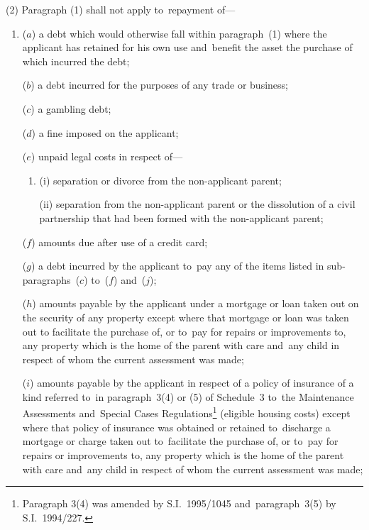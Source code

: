 \documentclass[12pt,a4paper]{article}
\begin{document}
(2) Paragraph (1) shall not apply to~repayment of—
\begin{enumerate}\item[]
($a$) a debt which would otherwise fall within paragraph~(1) where the applicant
has retained for his own use and~benefit the asset the purchase of which
incurred the debt;

($b$) a debt incurred for the purposes of any trade or business;

($c$) a gambling debt;

($d$) a fine imposed on the applicant;


($e$) unpaid legal costs in respect of—
\begin{enumerate}\item[]
(i) separation or divorce from the non-applicant parent;

(ii) separation from the non-applicant parent or the dissolution of a civil partnership that had been formed with the non-applicant parent;
\end{enumerate}

($f$) amounts due after use of a credit card;

($g$) a debt incurred by the applicant to~pay any of the items listed in
sub-paragraphs~($c$) to~($f$) and~($j$);

($h$) amounts payable by the applicant under a mortgage or loan taken out on the
security of any property except where that mortgage or loan was taken out to
facilitate the purchase of, or to~pay for repairs or improvements to, any
property which is the home of the parent with care and~any child in respect of
whom the current assessment was made;

($i$) amounts payable by the applicant in respect of a policy of insurance of a
kind referred to~in paragraph~3(4) or (5) of Schedule~3 to~the Maintenance
Assessments and~Special Cases Regulations\footnote{\frenchspacing Paragraph 3(4) was amended by S.I.~1995/1045 and~paragraph~3(5) by S.I.~1994/227.} (eligible housing costs) except
where that policy of insurance was obtained or retained to~discharge a mortgage
or charge taken out to~facilitate the purchase of, or to~pay for repairs or
improvements to, any property which is the home of the parent with care and~any
child in respect of whom the current assessment was made;


\end{enumerate}
\end{document}
